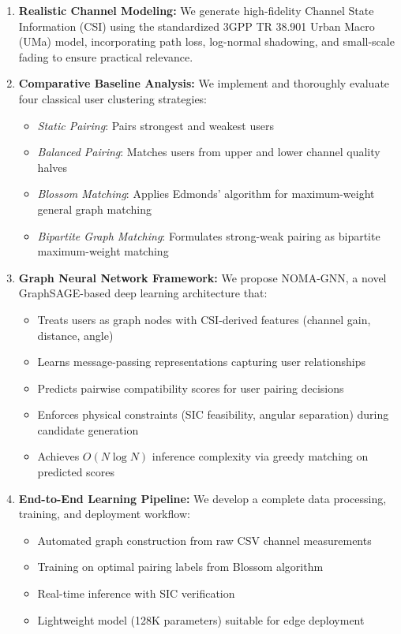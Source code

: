 \begin{enumerate}
    \item \textbf{Realistic Channel Modeling:} We generate high-fidelity Channel State Information (CSI) using the standardized 3GPP TR 38.901 Urban Macro (UMa) model, incorporating path loss, log-normal shadowing, and small-scale fading to ensure practical relevance.
    
    \item \textbf{Comparative Baseline Analysis:} We implement and thoroughly evaluate four classical user clustering strategies:
    \begin{itemize}
        \item \emph{Static Pairing}: Pairs strongest and weakest users
        \item \emph{Balanced Pairing}: Matches users from upper and lower channel quality halves
        \item \emph{Blossom Matching}: Applies Edmonds' algorithm for maximum-weight general graph matching
        \item \emph{Bipartite Graph Matching}: Formulates strong-weak pairing as bipartite maximum-weight matching
    \end{itemize}
    
    \item \textbf{Graph Neural Network Framework:} We propose NOMA-GNN, a novel GraphSAGE-based deep learning architecture that:
    \begin{itemize}
        \item Treats users as graph nodes with CSI-derived features (channel gain, distance, angle)
        \item Learns message-passing representations capturing user relationships
        \item Predicts pairwise compatibility scores for user pairing decisions
        \item Enforces physical constraints (SIC feasibility, angular separation) during candidate generation
        \item Achieves $O(N \log N)$ inference complexity via greedy matching on predicted scores
    \end{itemize}
    
    \item \textbf{End-to-End Learning Pipeline:} We develop a complete data processing, training, and deployment workflow:
    \begin{itemize}
        \item Automated graph construction from raw CSV channel measurements
        \item Training on optimal pairing labels from Blossom algorithm
        \item Real-time inference with SIC verification
        \item Lightweight model (128K parameters) suitable for edge deployment
    \end{itemize}
    

\end{enumerate}

